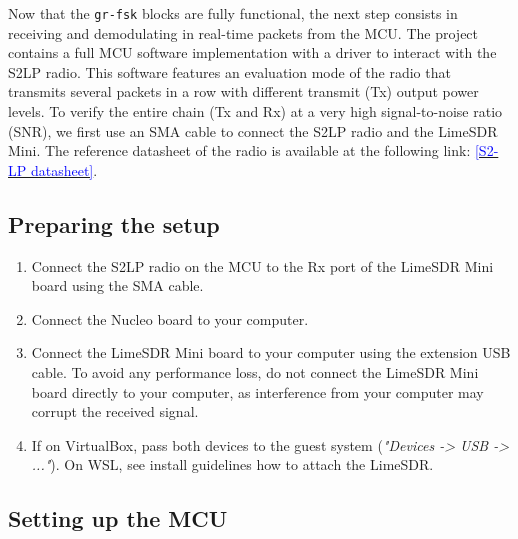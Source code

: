 Now that the \texttt{gr-fsk} blocks are fully functional, the next step consists in receiving and demodulating in real-time packets from the MCU.
The project contains a full MCU software implementation with a driver to interact with the S2LP radio.
This software features an evaluation mode of the radio that transmits several packets in a row with different transmit (Tx) output power levels.
To verify the entire chain (Tx and Rx) at a very high signal-to-noise ratio (SNR), we first use an SMA cable to connect the S2LP radio and the LimeSDR Mini.
The reference datasheet of the radio is available at the following link: \href{https://www.st.com/resource/en/datasheet/s2-lp.pdf}{\textcolor{blue}{[S2-LP datasheet]}}.

\subsection{Preparing the setup}

\begin{enumerate}
    \item Connect the S2LP radio on the MCU to the Rx port of the LimeSDR Mini board using the SMA cable.
    \item Connect the Nucleo board to your computer.
    \item Connect the LimeSDR Mini board to your computer using the extension USB cable.
    To avoid any performance loss, do not connect the LimeSDR Mini board directly to your computer, as interference from your computer may corrupt the received signal.
    \item If on VirtualBox, pass both devices to the guest system (\textit{"Devices -> USB -> ..."}). On WSL, see install guidelines how to attach the LimeSDR.
\end{enumerate}


\subsection{Setting up the MCU}

